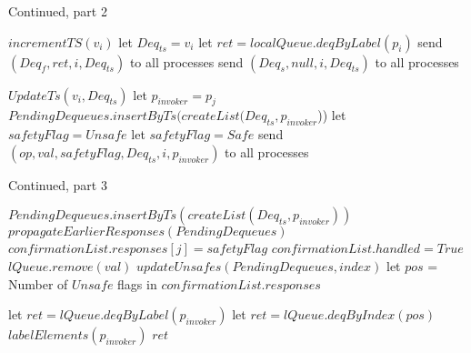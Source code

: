 \documentclass[a4paper,USenglish]{lipics-v2021} %
\begin{document}
\begin{algorithm}
  \caption{Continued, part 2}
  \begin{algorithmic}[1]
      \State $incrementTS(v_i)$
      \State let $Deq_{ts} = v_i$
        \State let $ret = localQueue.deqByLabel(p_i)$
        \State send $(Deq_f, ret, i, Deq_{ts})$ to all processes
      \Else
        \State send $(Deq_s, null, i, Deq_{ts})$ to all processes
      \EndIf
    \EndFunction

      \State $UpdateTs(v_i, Deq_{ts})$
      \State let $p_{invoker} = p_j$
      \State $PendingDequeues.insertByTs(createList(Deq_{ts}, p_{invoker}$))
      \EndIf
        \State let $safetyFlag = Unsafe$
      \Else
        \State let $safetyFlag = Safe$
      \EndIf
      \State send $(op, val, safetyFlag, Deq_{ts}, i, p_{invoker})$ to all processes
    \EndFunction

  \end{algorithmic}
\end{algorithm}

\begin{algorithm}
  \caption{Continued, part 3}
  \begin{algorithmic}[1]
        \State $PendingDequeues.insertByTs(createList(Deq_{ts}, p_{invoker}))$
      \EndIf
      \State $propagateEarlierResponses(PendingDequeues)$ 
          \State $confirmationList.responses[j] = safetyFlag$
        \EndIf 
          \State $confirmationList.handled = True$ 
            \State $lQueue.remove(val)$
          \EndIf 
          \State $updateUnsafes(PendingDequeues, index)$
           
            \State \Return
          \EndIf
          \State let $pos$ = Number of $Unsafe$ flags in $confirmationList.responses$

          \State let $ret = lQueue.deqByLabel(p_{invoker})$
          \Else 
            \State let $ret = lQueue.deqByIndex(pos)$
          \EndIf
          \State $labelElements(p_{invoker})$
            \State \Return $ret$
          \EndIf
        \EndIf 
      \EndFor
    \EndFunction
  \end{algorithmic}
\end{algorithm}
\end{document}
